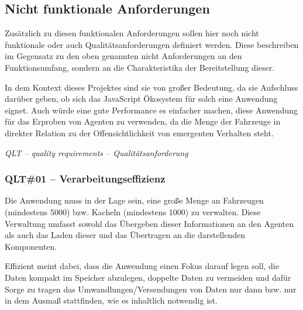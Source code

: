 \subsection{Nicht funktionale Anforderungen}

Zusätzlich zu diesen funktionalen Anforderungen sollen hier noch nicht funktionale oder auch Qualitätsanforderungen definiert werden.
Diese beschreiben im Gegensatz zu den oben genannten nicht Anforderungen an den Funktionsumfang, sondern an die Charakteristika der Bereitstellung dieser.

In dem Kontext dieses Projektes sind sie von großer Bedeutung, da sie Aufschluss darüber geben, ob sich das JavaScript Ökosystem für solch eine Anwendung eignet.
Auch würde eine gute Performance es einfacher machen, diese Anwendung für das Erproben von Agenten zu verwenden, da die Menge der Fahrzeuge in direkter Relation zu der Offensichtlichkeit von emergenten Verhalten steht.

%

\textit{QLT – quality requirements – Qualitätsanforderung}

\subsubsection{QLT\#01 – Verarbeitungseffizienz} \label{qlt:processing_efficiency}

Die Anwendung muss in der Lage sein, eine große Menge an Fahrzeugen (mindestens 5000) bzw. Kacheln (mindestens 1000) zu verwalten.
Diese Verwaltung umfasst sowohl das Übergeben dieser Informationen an den Agenten als auch das Laden dieser und das Übertragen an die darstellenden Komponenten.

Effizient meint dabei, dass die Anwendung einen Fokus darauf legen soll, die Daten kompakt im Speicher abzulegen, doppelte Daten zu vermeiden und dafür Sorge zu tragen das Umwandlungen/Versendungen von Daten nur dann bzw. nur in dem Ausmaß stattfinden, wie es inhaltlich notwendig ist.

